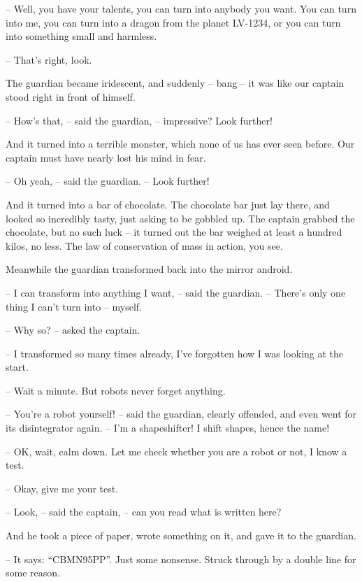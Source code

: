 \documentclass[ebook,oneside,final,openright]{memoir}
\begin{document}
– Well, you have your talents, you can turn into anybody you want. You can turn into me, you can turn into a dragon from the planet LV-1234, or you can turn into something small and harmless.\par
– That’s right, look.\par
\par
The guardian became iridescent, and suddenly – bang – it was like our captain stood right in front of himself.\par
– How’s that, – said the guardian, – impressive? Look further!\par
And it turned into a terrible monster, which none of us has ever seen before. Our captain must have nearly lost his mind in fear.\par
– Oh yeah, – said the guardian. – Look further!\par
\par
And it turned into a bar of chocolate. The chocolate bar just lay there, and looked so incredibly tasty, just asking to be gobbled up. The captain grabbed the chocolate, but no such luck – it turned out the bar weighed at least a hundred kilos, no less. The law of conservation of mass in action, you see.\par
\par
Meanwhile the guardian transformed back into the mirror android.\par
– I can transform into anything I want, – said the guardian. – There’s only one thing I can’t turn into – myself.\par
– Why so? – asked the captain.\par
– I transformed so many times already, I’ve forgotten how I was looking at the start.\par
– Wait a minute. But robots never forget anything.\par
– You’re a robot yourself! – said the guardian, clearly offended, and even went for its disintegrator again. – I’m a shapeshifter! I shift shapes, hence the name!\par
– OK, wait, calm down. Let me check whether you are a robot or not, I know a test.\par
– Okay, give me your test.\par
– Look, – said the captain, – can you read what is written here?\par
And he took a piece of paper, wrote something on it, and gave it to the guardian.\par
– It says: “CBMN95PP”. Just some nonsense. Struck through by a double line for some reason.\par
\end{document}

